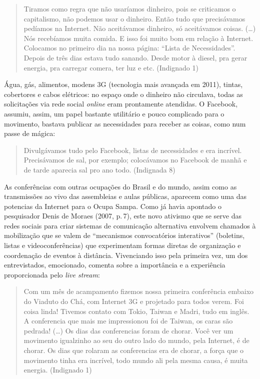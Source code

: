 \begin{quote}
Tiramos como regra que não usaríamos dinheiro, pois se criticamos o
capitalismo, não podemos usar o dinheiro. Então tudo que precisávamos
pedíamos na Internet. Não aceitávamos dinheiro, só aceitávamos coisas.
(\ldots{}) Nós recebíamos muita comida. E isso foi muito bom em relação à
Internet. Colocamos no primeiro dia na nossa página: ``Lista de
Necessidades''. Depois de três dias estava tudo sanando. Desde motor à
diesel, pra gerar energia, pra carregar comera, ter luz e etc.
(Indignado 1)
\end{quote}

Água, gás, alimentos, modens 3G (tecnologia mais avançada em 2011),
tintas, cobertores e cabos elétricos: no espaço onde o dinheiro não
circulava, todas as solicitações via rede social \emph{online} eram prontamente
atendidas. O Facebook, assumiu, assim, um papel bastante utilitário e
pouco complicado para o movimento, bastava publicar as necessidades para
receber as coisas, como num passe de mágica:

\begin{quote}
Divulgávamos tudo pelo Facebook, listas de necessidades e era incrível.
Precisávamos de sal, por exemplo; colocávamos no Facebook de manhã e de
tarde aparecia sal pro ano todo. (Indignada 8)
\end{quote}

As conferências com outras ocupações do Brasil e do mundo, assim como as
transmissões ao vivo das assembleias e aulas públicas, aparecem como uma
das potencias da Internet para o Ocupa Sampa. Como já havia apontado o
pesquisador Denis de Moraes (2007, p.\,7), este novo ativismo que se
serve das redes sociais para criar sistemas de comunicação alternativa
envolvem chamados à mobilização que se valem de ``mecanismos
convocatórios interativos'' (boletins, listas e videoconferências) que
experimentam formas diretas de organização e coordenação de eventos à
distância. Vivenciando isso pela primeira vez, um dos entrevistados,
emocionado, comenta sobre a importância e a experiência proporcionada
pelo \emph{live stream}:

\begin{quote}
Com um mês de acampamento fizemos nossa primeira conferência embaixo do
Viaduto do Chá, com Internet 3G e projetado para todos verem. Foi coisa
linda! Tivemos contato com Tokio, Taiwan e Madri, tudo em inglês. A
conferencia que mais me impressionou foi de Taiwan, os caras são
pedrada! (\ldots{}) Os dias das conferencias foram de chorar. Você ver um
movimento igualzinho ao seu do outro lado do mundo, pela Internet, é de
chorar. Os dias que rolaram as conferencias era de chorar, a força que o
movimento tinha era incrível, todo mundo ali pela mesma causa, é muita
energia. (Indignado 1)
\end{quote}

